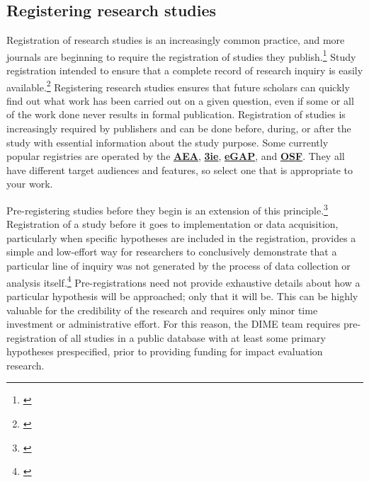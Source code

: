 \documentclass[]{tufte-book}
\begin{document}
\hypertarget{registering-research-studies}{%
\subsection*{Registering research
studies}\label{registering-research-studies}}

Registration of research studies is an increasingly common practice, and
more journals are beginning to require the registration of studies they
publish.\footnote{\cite{@vilhuber2020report}} Study registration
intended to ensure that a complete record of research inquiry is easily
available.\footnote{\href{https://dimewiki.worldbank.org/Study_Registration}{}}
Registering research studies ensures that future scholars can quickly
find out what work has been carried out on a given question, even if
some or all of the work done never results in formal publication.
Registration of studies is increasingly required by publishers and can
be done before, during, or after the study with essential information
about the study purpose. Some currently popular registries are operated
by the \href{https://www.socialscienceregistry.org}{\textbf{AEA}},
\href{https://ridie.3ieimpact.org}{\textbf{3ie}},
\href{https://egap.org/content/registration}{\textbf{eGAP}}, and
\href{https://osf.io/registries}{\textbf{OSF}}. They all have different
target audiences and features, so select one that is appropriate to your
work. 

Pre-registering studies before they begin is an extension of this
principle.\footnote{\cite{@nosek2018preregistration}} Registration of a
study before it goes to implementation or data acquisition, particularly
when specific hypotheses are included in the registration, provides a
simple and low-effort way for researchers to conclusively demonstrate
that a particular line of inquiry was not generated by the process of
data collection or analysis itself.\footnote{\href{https://dimewiki.worldbank.org/Pre-Registration}{}}
Pre-registrations need not provide exhaustive details about how a
particular hypothesis will be approached; only that it will be. This can
be highly valuable for the credibility of the research and requires only
minor time investment or administrative effort. For this reason, the
DIME team requires pre-registration of all studies in a public database
with at least some primary hypotheses prespecified, prior to providing
funding for impact evaluation research.
\end{document}
